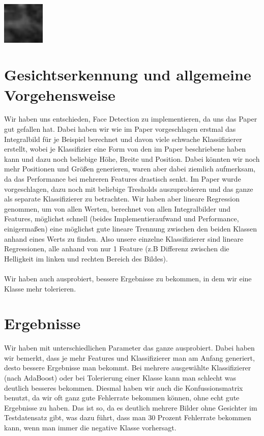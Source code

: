 \includegraphics[height=2cm]{./imgs/B1_00005.png}

\section*{Gesichtserkennung und allgemeine Vorgehensweise}

Wir haben uns entschieden, Face Detection zu implementieren, da uns das Paper gut gefallen hat. Dabei haben wir
wie im Paper vorgeschlagen erstmal das Integralbild für je Beispiel berechnet und davon viele schwache Klassifizierer
erstellt, wobei je Klassifizier eine Form von den im Paper beschriebene haben kann und dazu noch beliebige Höhe,
Breite und Position. Dabei könnten wir noch mehr Positionen und Größen generieren, waren aber dabei ziemlich aufmerksam,
da das Performance bei mehreren Features drastisch senkt. Im Paper wurde vorgeschlagen, dazu noch mit beliebige Tresholds
auszuprobieren und das ganze als separate Klassifizierer zu betrachten. Wir haben aber lineare Regression genommen,
um von allen Werten, berechnet von allen Integralbilder und Features, möglichst schnell (beides Implementieraufwand und
Performance, einigermaßen) eine möglichst gute lineare Trennung zwischen den beiden Klassen anhand eines Werts zu
finden. Also unsere einzelne Klassifizierer sind lineare Regressionen, alle anhand von nur 1 Feature (z.B Differenz
zwischen die Helligkeit im linken und rechten Bereich des Bildes). \\ \\

Wir haben auch ausprobiert, bessere Ergebnisse zu bekommen, in dem wir eine Klasse mehr tolerieren.

\section*{Ergebnisse}

Wir haben mit unterschiedlichen Parameter das ganze ausprobiert. Dabei haben wir bemerkt, dass je mehr
Features und Klassifizierer man am Anfang generiert, desto bessere Ergebnisse man bekommt. Bei mehrere
ausgewählte Klassifizierer (nach AdaBoost) oder bei Tolerierung einer Klasse kann man schlecht was deutlich
besseres bekommen. Diesmal haben wir auch die Konfussionsmatrix benutzt, da wir oft ganz gute Fehlerrate bekommen
können, ohne echt gute Ergebnisse zu haben. Das ist so, da es deutlich mehrere Bilder ohne Gesichter im
Testdatensatz gibt, was dazu führt, dass man 30 Prozent Fehlerrate bekommen kann, wenn man immer die negative
Klasse vorhersagt. \\

